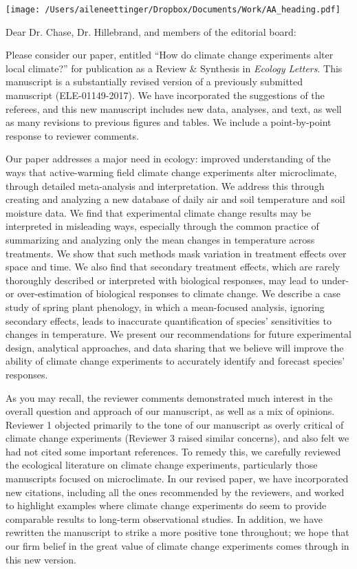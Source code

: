 \documentclass[11pt,a4paper]{letter}
\begin{document}


\begin{letter}{}
\texttt{[image: /Users/aileneettinger/Dropbox/Documents/Work/AA\_heading.pdf]}

\opening{Dear Dr. Chase, Dr. Hillebrand, and members of the editorial board:}
Please consider our paper, entitled ``How do climate change experiments alter local climate?'' for publication as a Review \& Synthesis in \emph{Ecology Letters}. This manuscript is a substantially revised version of a previously submitted manuscript  (ELE-01149-2017). We have incorporated the suggestions of the referees, and this new manuscript includes new data, analyses, and text, as well as many revisions to previous figures and tables. We include a point-by-point response to reviewer comments.

Our paper addresses a major need in ecology: improved understanding of the ways that active-warming field climate change experiments alter microclimate, through detailed meta-analysis and interpretation. We address this through creating and analyzing a new database of daily air and soil temperature and soil moisture data.  We find that experimental climate change results may be interpreted in misleading ways, especially through the common practice of summarizing and analyzing only the mean changes in temperature across treatments.  We show that such methods mask variation in treatment effects over space and time. We also find that secondary treatment effects, which are rarely thoroughly described or interpreted with biological responses, may lead to under- or over-estimation of biological responses to climate change. We describe a case study of spring plant phenology, in which a mean-focused analysis, ignoring secondary effects, leads to inaccurate quantification of species' sensitivities to changes in temperature. We present our recommendations for future experimental design, analytical approaches, and data sharing that we believe will improve the ability of climate change experiments to accurately identify and forecast species' responses.

As you may recall, the reviewer comments demonstrated much interest in the overall question and approach of our manuscript, as well as a mix of opinions.  Reviewer 1 objected primarily to the tone of our manuscript as overly critical of climate change experiments (Reviewer 3 raised similar concerns), and also felt we had not cited some important references. To remedy this, we carefully reviewed the ecological literature on climate change experiments, particularly those manuscripts focused on microclimate. In our revised paper, we have incorporated new citations, including all the ones recommended by the reviewers, and worked to highlight examples where climate change experiments do seem to provide comparable results to long-term observational studies. In addition, we have rewritten the manuscript to strike a more positive tone throughout; we hope that our firm belief in the great value of climate change experiments comes through in this new version.


\end{letter}
\end{document}
